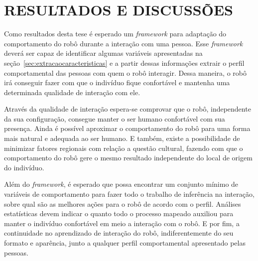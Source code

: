 \chapter{RESULTADOS E DISCUSSÕES}
\label{cap:resultados}
Como resultados desta tese é esperado um \emph{framework} para adaptação do comportamento do robô durante a interação com uma pessoa. Esse \emph{framework} deverá ser capaz de identificar algumas variáveis apresentadas na seção~\ref{sec:extracaocaracteristicas} e a partir dessas informações extrair o perfil comportamental das pessoas com quem o robô interagir. Dessa maneira, o robô irá conseguir fazer com que o indivíduo fique confortável e mantenha uma determinada qualidade de interação com ele.

Através da qualidade de interação espera-se comprovar que o robô, independente da sua configuração, consegue manter o ser humano confortável com sua presença. Ainda é possível aproximar o comportamento do robô para uma forma mais natural e adequada ao ser humano. E também, existe a possibilidade de minimizar fatores regionais com relação a questão cultural, fazendo com que o comportamento do robô gere o mesmo resultado independente do local de origem do indivíduo.

Além do \emph{framework}, é esperado que possa encontrar um conjunto mínimo de variáveis de comportamento para fazer todo o trabalho de inferência na interação, sobre qual são as melhores ações para o robô de acordo com o perfil. Análises estatísticas devem indicar o quanto todo o processo mapeado auxiliou para manter o indivíduo confortável em meio a interação com o robô. E por fim, a continuidade no aprendizado de interação do robô, indiferentemente do seu formato e aparência, junto a qualquer perfil comportamental apresentado pelas pessoas.
